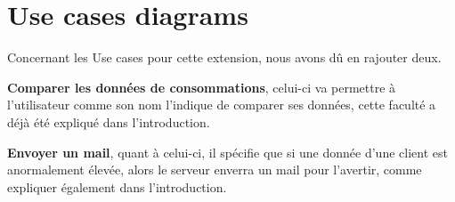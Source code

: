 \section{Use cases diagrams}

\begin{flushleft}
Concernant les Use cases pour cette extension, nous avons dû en rajouter deux.
\end{flushleft}

\begin{flushleft}
\textbf{Comparer les données de consommations}, celui-ci va permettre à l'utilisateur comme son nom l'indique de comparer ses données, cette faculté a déjà été expliqué dans l'introduction.
\end{flushleft}

\begin{flushleft}
\textbf{Envoyer un mail}, quant à celui-ci, il spécifie que si une donnée d'une client est anormalement élevée, alors le serveur enverra un mail pour l'avertir, comme expliquer également dans l'introduction.
\end{flushleft}


